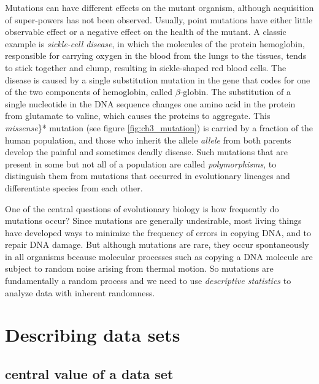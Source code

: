\documentclass[
]{book}
\theoremstyle{definition}
\theoremstyle{definition}
\theoremstyle{definition}
\theoremstyle{remark}
\begin{document}
Mutations can have different effects on the mutant organism, although acquisition of super-powers has not been observed. Usually, point mutations have either little observable effect or a negative effect on the health of the mutant. A classic example is  \emph{sickle-cell disease}, in which the molecules of the protein hemoglobin, responsible for carrying oxygen in the blood from the lungs to the tissues, tends to stick together and clump, resulting in sickle-shaped red blood cells. The disease is caused by a single substitution mutation in the gene that codes for one of the two components of hemoglobin, called \(\beta\)-globin. The substitution of a single nucleotide in the DNA sequence changes one amino acid in the protein from glutamate to valine, which causes the proteins to aggregate. This  \emph{missense}\}* mutation (see figure \ref{fig:ch3_mutation}) is carried by a fraction of the human population, and those who inherit the allele \emph{allele} from both parents develop the painful and sometimes deadly disease. Such mutations that are present in some but not all of a population are called  \emph{polymorphisms}, to distinguish them from mutations that occurred in evolutionary lineages and differentiate species from each other.

One of the central questions of evolutionary biology is how frequently do mutations occur? Since mutations are generally undesirable, most living things have developed ways to minimize the frequency of errors in copying DNA, and to repair DNA damage. But although mutations are rare, they occur spontaneously in all organisms because molecular processes such as copying a DNA molecule are subject to random noise arising from thermal motion. So mutations are fundamentally a random process and we need to use  \emph{descriptive statistics} to analyze data with inherent randomness.

\hypertarget{describing-data-sets-1}{%
\section{Describing data sets}\label{describing-data-sets-1}}

\label{sec:math3}

\hypertarget{central-value-of-a-data-set}{%
\subsection{central value of a data set}\label{central-value-of-a-data-set}}
\end{document}
